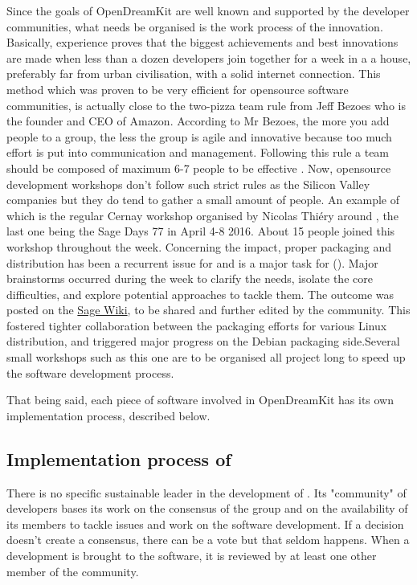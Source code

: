 \documentclass{deliverablereport}
\begin{document}
Since the goals of OpenDreamKit are well known and supported by the developer communities, what needs be organised is the work process of the innovation. Basically, experience proves that the biggest achievements and best innovations are made when less than a dozen developers join together for a week in a a house, preferably far from urban civilisation, with a solid internet connection. This method which was proven to be very efficient for opensource software communities, is actually close to the two-pizza team rule from Jeff Bezoes who is the founder and CEO of Amazon. According to Mr Bezoes, the more you add people to a group, the less the group is agile and innovative because too much effort is put into communication and management. Following this rule a team should be composed of maximum 6-7 people to be effective .
Now, opensource development workshops don't follow such strict rules as the Silicon Valley companies but they do tend to gather a small amount of people. An example of which is the regular Cernay workshop organised by Nicolas Thiéry around \Sage, the last one being the Sage Days 77 in April 4-8 2016. About 15 people joined this workshop throughout the week. Concerning the impact, proper packaging and distribution has been a recurrent issue for \Sage and is a major task for \ODK (). Major brainstorms occurred during the week to clarify the needs, isolate the core difficulties, and explore potential approaches to tackle them. The outcome was posted on the \href{https://wiki.sagemath.org/days77/packaging}{Sage Wiki}, to be shared and further edited by the community. This fostered tighter collaboration between the packaging efforts for various Linux distribution, and triggered major progress on the Debian packaging side.Several small workshops such as this one are to be organised all project long to speed up the software development process.

That being said, each piece of software involved in OpenDreamKit has its own implementation process, described below.

\subsection{Implementation process of \Sage}

There is no specific sustainable leader in the development of \Sage. Its "community" of developers bases its work on the consensus of the group and on the availability of its members to tackle issues and work on the software development. If a decision doesn't create a consensus, there can be a vote but that seldom happens. 
When a development is brought to the software, it is reviewed by at least one other member of the community.
\end{document}
